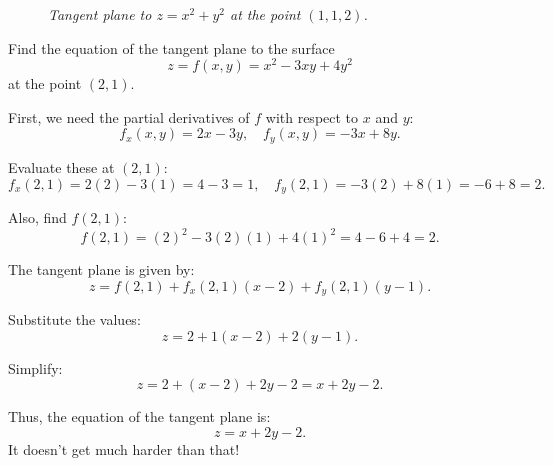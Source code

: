 \begin{figure}[H]
\centering
{}
\caption{\textit{Tangent plane to $z=x^2+y^2$ at the point $(1,1,2)$.}}
\end{figure}

\exampleline
\begin{example}
Find the equation of the tangent plane to the surface
\[
z = f(x,y) = x^2 - 3xy + 4y^2
\]
at the point \((2,1)\).

\begin{solution}
First, we need the partial derivatives of \( f \) with respect to \( x \) and \( y \):
\[
f_x(x,y) = 2x - 3y, \quad f_y(x,y) = -3x + 8y.
\]

Evaluate these at \((2,1)\):
\[
f_x(2,1) = 2(2) - 3(1) = 4 - 3 = 1, \quad f_y(2,1) = -3(2) + 8(1) = -6 + 8 = 2.
\]

Also, find \( f(2,1) \):
\[
f(2,1) = (2)^2 - 3(2)(1) + 4(1)^2 = 4 - 6 + 4 = 2.
\]

The tangent plane is given by:
\[
z = f(2,1) + f_x(2,1)(x - 2) + f_y(2,1)(y - 1).
\]

Substitute the values:
\[
z = 2 + 1(x - 2) + 2(y - 1).
\]

Simplify:
\[
z = 2 + (x - 2) + 2y - 2 = x + 2y - 2.
\]

Thus, the equation of the tangent plane is:
\[
z = x + 2y - 2.
\]
It doesn't get much harder than that!
\end{solution}
\end{example}
\exampleline


